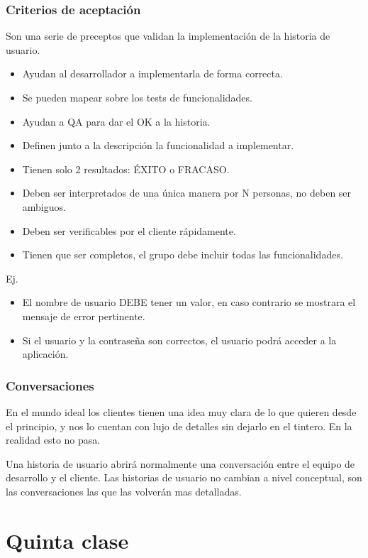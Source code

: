 \documentclass[titlepage,a4paper]{article}
\begin{document}
\subsubsection*{Criterios de aceptación}
Son una serie de preceptos que validan la implementación de la historia de usuario.
\begin{itemize}
    \item Ayudan al desarrollador a implementarla de forma correcta.
    \item Se pueden mapear sobre los tests de funcionalidades.
    \item Ayudan a QA para dar el OK a la historia.
    \item Definen junto a la descripción la funcionalidad a implementar.
    \item Tienen solo 2 resultados: ÉXITO o FRACASO.
    \item Deben ser interpretados de una única manera por N personas, no deben ser ambiguos.
    \item Deben ser verificables por el cliente rápidamente.
    \item Tienen que ser completos, el grupo debe incluir todas las funcionalidades.
\end{itemize}

Ej.
\begin{itemize}
    \item El nombre de usuario DEBE tener un valor, en caso contrario se mostrara el mensaje de error pertinente.
    \item Si el usuario y la contraseña son correctos, el usuario podrá acceder a la aplicación.
\end{itemize}

\subsubsection*{Conversaciones}
En el mundo ideal los clientes tienen una idea muy clara de lo que quieren desde el principio, y nos lo cuentan con lujo de detalles sin dejarlo en el tintero. En la realidad esto no pasa.

Una historia de usuario abrirá normalmente una conversación entre el equipo de desarrollo y el cliente. Las historias de usuario no cambian a nivel conceptual, son las conversaciones las que las volverán mas detalladas.


\section*{Quinta clase}
\end{document}
